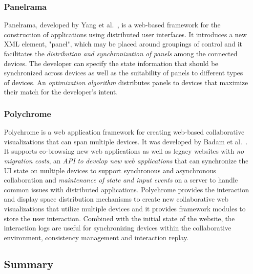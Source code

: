 \subsubsection{Panelrama}

Panelrama, developed by Yang et al.~\cite{panelrama2014}, is a web-based framework for the construction of applications using distributed user interfaces. It introduces a new XML element, "panel", which may be placed around groupings of control and it facilitates the \emph{distribution and synchronization of panels} among the connected devices. The developer can specify the state information that should be synchronized across devices as well as the suitability of panels to different types of devices. An \emph{optimization algorithm} distributes panels to devices that maximize their match for the developer's intent.

\subsubsection{Polychrome}

Polychrome is a web application framework for creating web-based collaborative visualizations that can span multiple devices. It was developed by Badam et al.~\cite{polychrome2014}. It supports co-browsing new web applications as well as legacy websites with \emph{no migration costs}, an \emph{API to develop new web applications} that can synchronize the UI state on multiple devices to support synchronous and asynchronous collaboration and \emph{maintenance of state and input events} on a server to handle common issues with distributed applications. Polychrome provides the interaction and display space distribution mechanisms to create new collaborative web visualizations that utilize multiple devices and it provides framework modules to store the user interaction. Combined with the initial state of the website, the interaction logs are useful for synchronizing devices within the collaborative environment, consistency management and interaction replay.

\subsection{Summary}


